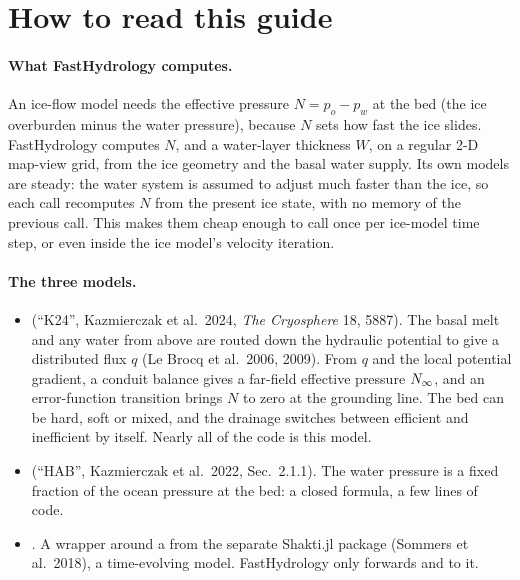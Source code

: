 \section{How to read this guide}

\paragraph{What FastHydrology computes.} An ice-flow model needs the effective pressure $N = p_o - p_w$ at the
bed (the ice overburden minus the water pressure), because $N$ sets how fast the ice slides. FastHydrology
computes $N$, and a water-layer thickness $W$, on a regular 2-D map-view grid, from the ice geometry and the
basal water supply. Its own models are steady: the water system is assumed to adjust much faster than the ice, so
each call recomputes $N$ from the present ice state, with no memory of the previous call. This makes them cheap
enough to call once per ice-model time step, or even inside the ice model's velocity iteration.

\paragraph{The three models.}
\begin{itemize}[leftmargin=1.5em]
\item {} (``K24'', Kazmierczak et al.\ 2024, \emph{The Cryosphere} 18, 5887). The basal
  melt and any water from above are routed down the hydraulic potential to give a distributed flux $q$
  (Le Brocq et al.\ 2006, 2009). From $q$ and the local potential gradient, a conduit balance gives a far-field
  effective pressure ${N_\infty}$, and an error-function transition brings $N$ to zero at the grounding line. The bed
  can be hard, soft or mixed, and the drainage switches between efficient and inefficient by itself. Nearly all
  of the code is this model.
\item {} (``HAB'', Kazmierczak et al.\ 2022, Sec.~2.1.1). The water pressure is a fixed fraction
  of the ocean pressure at the bed: a closed formula, a few lines of code.
\item {}. A wrapper around a  from the separate Shakti.jl package
  (Sommers et al.\ 2018), a time-evolving model. FastHydrology only forwards  and  to it.
\end{itemize}

